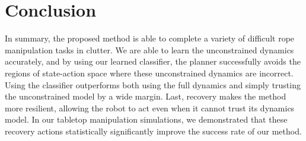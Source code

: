 \section{Conclusion}

In summary, the proposed method is able to complete a variety of difficult rope manipulation tasks in clutter. We are able to learn the unconstrained dynamics accurately, and by using our learned classifier, the planner successfully avoids the regions of state-action space where these unconstrained dynamics are incorrect. Using the classifier outperforms both using the full dynamics and simply trusting the unconstrained model by a wide margin. Last, recovery makes the method more resilient, allowing the robot to act even when it cannot trust its dynamics model. In our tabletop manipulation simulations, we demonstrated that these recovery actions statistically significantly improve the success rate of our method.